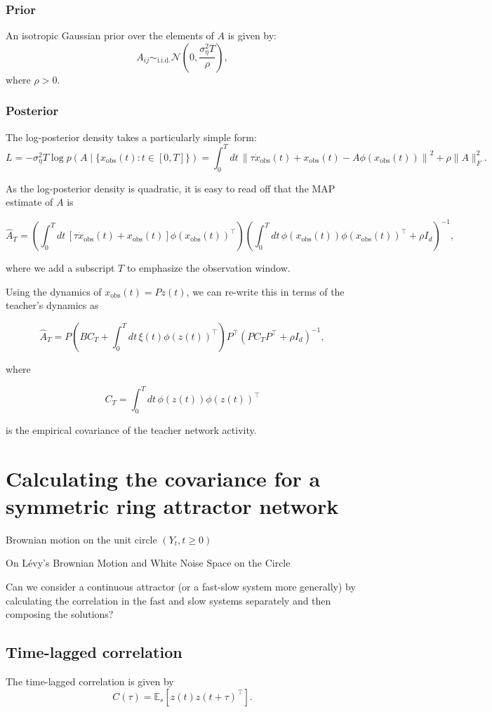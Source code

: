 \documentclass{article}
\theoremstyle{definition} \newtheorem{definition}{Definition}
\theoremstyle{remark} \newtheorem{remark}{Remark}
\newcounter{ct}
\begin{document}
\subsubsection{Prior}
An isotropic Gaussian prior over the elements of \( A \) is given by:  
\[
A_{ij} \sim_{\text{i.i.d.}} \mathcal{N} \left( 0, \frac{\sigma^2_{\eta} T}{\rho} \right),
\]
where \( \rho > 0 \).


\subsubsection{Posterior}
The log-posterior density takes a particularly simple form:
\[
L = -\sigma^2_{\eta} T \log p\left(A \mid \{x_{\text{obs}}(t) : t \in [0, T]\} \right) = \int_{0}^{T} dt \, \left\| \tau \dot{x}_{\text{obs}}(t) + x_{\text{obs}}(t) - A \phi(x_{\text{obs}}(t)) \right\|^2 + \rho \|A\|^2_F.
\]



As the log-posterior density is quadratic, it is easy to read off that the MAP estimate of \( A \) is 

\[
\hat{A}_T = \left( \int_{0}^{T} dt \, \left[ \tau \dot{x}_{\text{obs}}(t) + x_{\text{obs}}(t) \right] \phi(x_{\text{obs}}(t))^\top \right) 
\left( \int_{0}^{T} dt \, \phi(x_{\text{obs}}(t)) \phi(x_{\text{obs}}(t))^\top + \rho I_d \right)^{-1},
\]

where we add a subscript \( T \) to emphasize the observation window. 

Using the dynamics of \( x_{\text{obs}}(t) = P z(t) \), we can re-write this in terms of the teacher’s dynamics as

\[
\hat{A}_T = P \left( B C_T + \int_{0}^{T} dt \, \xi(t) \phi(z(t))^\top \right) P^\top 
\left( P C_T P^\top + \rho I_d \right)^{-1},
\]

where

\[
C_T = \int_{0}^{T} dt \, \phi(z(t)) \phi(z(t))^\top
\]

is the empirical covariance of the teacher network activity.



\section{Calculating the covariance for a symmetric ring attractor network}

Brownian motion on the unit circle \((Y_t , t \geq 0)\) \citep{liu2012stochastic}

On L\'evy’s Brownian Motion and White Noise Space on the Circle \citep{huang2021levy}

Can we consider a continuous attractor (or a fast-slow system more generally) by calculating the correlation in the fast and slow systems separately and then composing the solutions?


\subsection{Time-lagged correlation}
The time-lagged correlation is given by
\[
C(\tau) = \mathbb{E}_s \left[ z(t) z(t + \tau)^\top \right].
\]


\newpage


\end{document}
